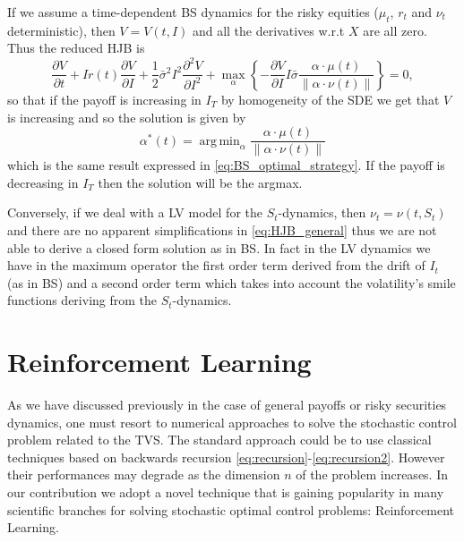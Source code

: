 \documentclass[11pt]{article}
\DeclareMathOperator*{\argmin}{arg\,min}
\begin{document}
If we assume a time-dependent BS dynamics for the risky equities ($\mu_t$, $r_t$ and $\nu_t$ deterministic), then $V = V(t,I)$ and all the derivatives w.r.t $X$ are all zero. Thus the reduced HJB is
\begin{equation}
	\frac{\partial V}{\partial t} +  I r(t)\frac{\partial V}{\partial I}  + \frac{1}{2}\bar{\sigma}^2I^2\frac{\partial^2V}{\partial I^2} + \max_\alpha \left\{ -\frac{\partial V}{\partial I} I  \bar{\sigma}\frac{\alpha \cdot \mu(t)}{\|\alpha \cdot \nu(t)\|}\right\} = 0,
\end{equation}
so that if the payoff is increasing in $I_T$ by homogeneity of the SDE we get that $V$ is increasing and so the solution is given by
\begin{equation}
 \alpha^*(t) = \argmin_\alpha \frac{\alpha \cdot \mu(t)}{\|\alpha \cdot \nu(t)\|}
	\end{equation}
which is the same result expressed in \cref{eq:BS_optimal_strategy}. If the payoff is decreasing in $I_T$ then the solution will be the argmax.

Conversely, if we deal with a LV model for the $S_t$-dynamics, then $\nu_t = \nu(t,S_t)$ and there are no apparent simplifications in \cref{eq:HJB_general} thus we are not able to derive a closed form solution as in BS. In fact in the LV dynamics we have in the maximum operator the first order term derived from the drift of $I_t$ (as in BS) and a second order term which takes into account the volatility's smile functions deriving from the $S_t$-dynamics. 


\section{Reinforcement Learning}\label{sec:RL}
As we have discussed previously in the case of general payoffs or risky securities dynamics, one must resort to numerical approaches to solve the stochastic control problem related to the TVS. The standard approach could be to use classical techniques based on backwards recursion \eqref{eq:recursion}-\eqref{eq:recursion2}. However their performances may degrade as the dimension $n$ of the problem increases. In our contribution we adopt a novel technique that is gaining popularity in many scientific branches for solving stochastic optimal control problems: Reinforcement Learning. 
\end{document}
